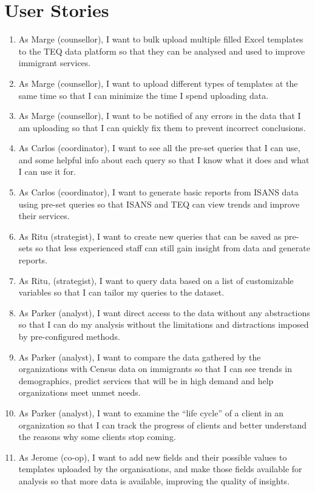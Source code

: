 \documentclass[]{scrartcl}
\begin{document}
\section{User Stories}
\begin{enumerate}[label=\textbf{U\arabic*.}]
	\item As Marge (counsellor), I want to bulk upload multiple filled Excel templates to the TEQ data platform so that they can be analysed and used to improve immigrant services.
	
	\item As Marge (counsellor), I want to upload different types of templates at the same time so that I can minimize the time I spend uploading data.
	
	\item As Marge (counsellor), I want to be notified of any errors in the data that I am uploading so that I can quickly fix them to prevent incorrect conclusions.
	
	\item As Carlos (coordinator), I want to see all the pre-set queries that I can use, and some helpful info about each query so that I know what it does and what I can use it for.
	
	\item As Carlos (coordinator), I want to generate basic reports from ISANS data using pre-set queries so that ISANS and TEQ can view trends and improve their services.
	
	\item As Ritu (strategist), I want to create new queries that can be saved as pre-sets so that less experienced staff can still gain insight from data and generate reports. 
	
	\item As Ritu, (strategist), I want to query data based on a list of customizable variables so that I can tailor my queries to the dataset.
	
	\item As Parker (analyst), I want direct access to the data without any abstractions so that I can do my analysis without the limitations and distractions imposed by pre-configured methods.
	
	\item As Parker (analyst), I want to compare the data gathered by the organizations with Census data on immigrants so that I can see trends in demographics, predict services that will be in high demand and help organizations meet unmet needs.
	
	\item As Parker (analyst), I want to examine the ``life cycle'' of a client in an organization so that I can track the progress of clients and better understand the reasons why some clients stop coming.
	
	\item As Jerome (co-op), I want to add new fields and their possible values to templates uploaded by the organisations, and make those fields available for analysis so that more data is available, improving the quality of insights.
\end{enumerate}
\end{document}
